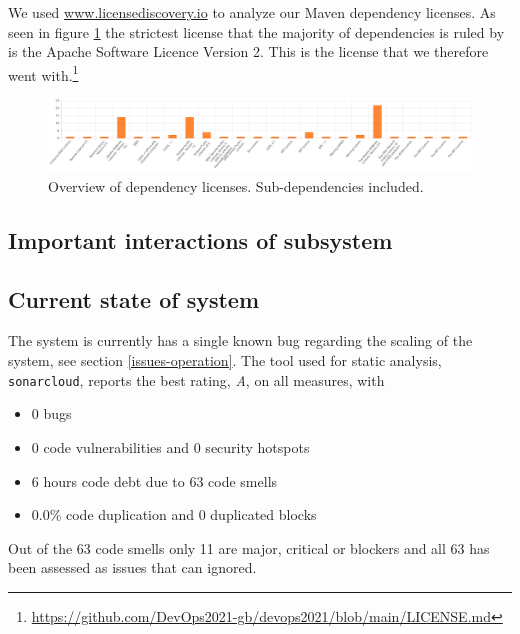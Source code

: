 We used \url{www.licensediscovery.io} to analyze our Maven dependency licenses. As seen in figure \ref{fig:licenceDep} the strictest license that the majority of dependencies is ruled by is the Apache Software Licence Version 2. This is the license that we therefore went with.\footnote{\url{https://github.com/DevOps2021-gb/devops2021/blob/main/LICENSE.md}} 
\begin{figure}[!htb]
    \centering
    \includegraphics[scale=0.2]{LicenceDependencies.png}
    \caption{Overview of dependency licenses. Sub-dependencies included.}
    \label{fig:licenceDep}
\end{figure}


\subsection{Important interactions of subsystem}

\subsection{Current state of system}
The system is currently has a single known bug regarding the scaling of the system, see section \ref{issues-operation}. The tool used for static analysis, \texttt{sonarcloud}, reports the best rating, \textit{A}, on all measures, with 

\begin{itemize}
    \item 0 bugs
    \item 0 code vulnerabilities and 0 security hotspots
    \item 6 hours code debt due to 63 code smells
    \item 0.0\% code duplication and 0 duplicated blocks
\end{itemize}

Out of the 63 code smells only 11 are major, critical or blockers and all 63 has been assessed as issues that can ignored.

